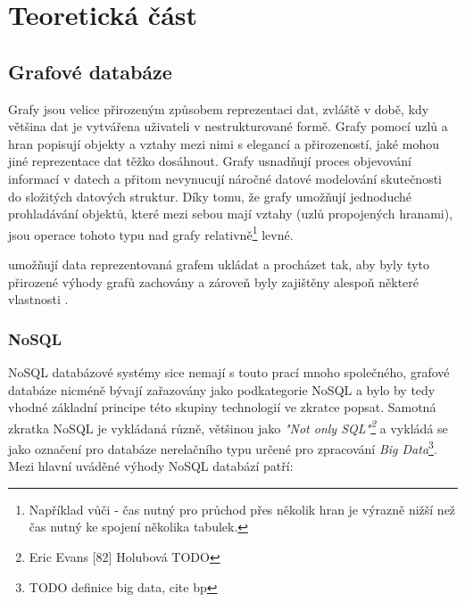\chapter{Teoretická část}

\section{Grafové databáze}

Grafy jsou velice přirozeným způsobem reprezentaci dat, zvláště v době, kdy většina dat je vytvářena uživateli v nestrukturované formě. Grafy pomocí uzlů a hran popisují objekty a vztahy mezi nimi s elegancí a přirozeností, jaké mohou jiné reprezentace dat těžko dosáhnout. Grafy usnadňují proces objevování informací v datech a přitom nevynucují náročné datové modelování skutečnosti do složitých datových struktur. Díky tomu, že grafy umožňují jednoduché prohladávání objektů, které mezi sebou mají vztahy (uzlů propojených hranami), jsou operace tohoto typu nad grafy relativně\footnote{Například vůči  - čas nutný pro průchod přes několik hran je výrazně nižší než čas nutný ke spojení několika tabulek.} levné. 

 umožňují data reprezentovaná grafem ukládat a procházet tak, aby byly tyto přirozené výhody grafů zachovány a zároveň byly zajištěny alespoň některé vlastnosti . 

\subsection{NoSQL}
\label{sec:gdb-nosql}
NoSQL databázové systémy sice nemají s touto prací mnoho společného, grafové databáze nicméně bývají zařazovány jako podkategorie NoSQL a bylo by tedy vhodné základní principe této skupiny technologií ve zkratce popsat. Samotná zkratka NoSQL je vykládaná různě, většinou jako \textit{"Not only SQL"\footnote{Eric Evans [82] Holubová TODO}} a vykládá se jako označení pro databáze nerelačního typu určené pro zpracování \textit{Big Data}\footnote{TODO definice big data, cite bp}. Mezi hlavní uváděné výhody NoSQL databází patří: 

